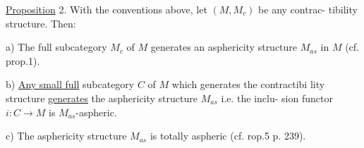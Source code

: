 \uline{Proposition} 2. With the conventions above, let $(M,M_c)$ be any contrac-%
tibility structure. Then:

a) The full subcategory $M_c$ of $M$ generates an asphericity structure
$M_{as}$ in $M$ (cf. prop.1).

b) \uline{Any small full} subcategory $C$ of $M$ which generates the contractibi
lity structure \uline{generates} the asphericity structure $M_{as}$\hand{,} i.e. the inclu-%
sion functor $i: C \to M$ is $M_{as}$-aspheric.

c) The asphericity structure $M_{as}$ is totally aspheric (cf. rop.5
p. 239).

